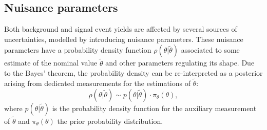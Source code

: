 \documentclass[../main.tex]{subfiles}
\begin{document}
\subsection{Nuisance parameters}
\label{hh:subsec:nuisances}

Both background and signal event yields are affected by several sources of uncertainties, modelled by introducing nuisance parameters. These nuisance parameters have a probability density function $\rho(\theta|\tilde{\theta})$ associated to some estimate of the nominal value $\tilde{\theta}$ and other parameters regulating its shape. Due to the Bayes' theorem, the probability density can be re-interpreted as a posterior arising from dedicated measurements for the estimations of $\tilde{\theta}$:
\begin{equation}
\rho(\theta|\tilde{\theta}) \sim p(\theta|\tilde{\theta}) \cdot \pi_\theta(\theta),
\end{equation}
where $p(\theta|\tilde{\theta})$ is the probability density function for the auxiliary measurement of $\tilde{\theta}$ and $\pi_\theta(\theta)$ the prior probability distribution.
\end{document}
